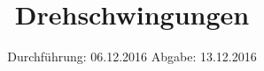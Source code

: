 


\subject{V102}
\title{Drehschwingungen}
\date{
	Durchführung: 06.12.2016
	\hspace{4em}
	Abgabe: 13.12.2016
}


	\maketitle
	\newpage
	\tableofcontents
	\newpage
	
	
	
	
	
	
	\newpage
	
	\printbibliography

